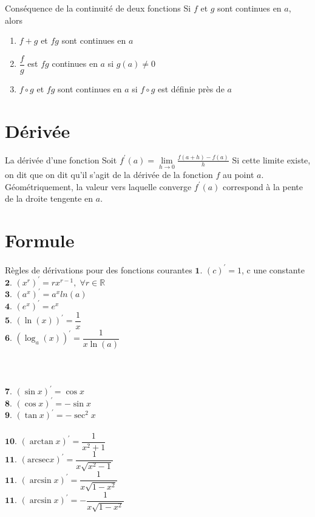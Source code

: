 \documentclass{report}
\newcommand{\varitem}[3][black]{%
    \item[%
        \colorbox{#2}{\textcolor{#1}{\makebox(5.5,7){#3}}}%
    ]
}
\begin{document}
\begin{multicols*}{3}
\begin{Identite}{Conséquence de la continuité de deux fonctions}{}
    Si $f$ et $g$ sont continues en $a$, alors 
    \begin{enumerate}
      \varitem{blue!40}{\textbf{1}} $f+g$ et $fg$ sont continues en $a$ 
      \varitem{blue!40}{\textbf{2}} $\dfrac{f}{g}$ est $fg$ continues en $a$ si $g(a) \neq 0$
      \varitem{blue!40}{\textbf{3}} $f \circ g$ et $fg$ sont continues en $a$ si $f \circ g$ 
      est définie près de $a$
    \end{enumerate}
\end{Identite}


\section{Dérivée}
\begin{Definitionx*}{La dérivée d'une fonction}{}
  Soit $f^{\prime}(a) = \lim\limits_{h\to 0}\frac{f(a + h) - f(a)}{h} $ Si cette limite existe, on dit que 
  on dit qu'il s'agit de \textcolor{myb}{la dérivée de la fonction}   $f$ au point $a$. Géométriquement, 
  la valeur vers laquelle converge $f^{\prime}(a)$ correspond à la pente de la droite tengente en $a$.
\end{Definitionx*}

\section{Formule}
\begin{Concept}{Règles de dérivations pour des fonctions courantes}{}
  $ \textbf{1. }   (c)^{\prime} = 1$, c une constante \;\;
  $ \textbf{2. }   (x^r)^{\prime} = rx^{r -1}, \; \forall r \in \mathbb{R}$ \\
  $ \textbf{3. }   (a^x)^{\prime} = a^xln(a)$ \\ 
  $ \textbf{4. }   (e^x)^{\prime} = e^x$ \\ 
  $ \textbf{5. }   (\ln(x))^{\prime} = \dfrac{1}{x} $ \\
  $ \textbf{6. }   (\log_a(x))^{\prime} = \dfrac{1}{x\ln(a)}$ \\\\\\\\
  $ \textbf{7. }   (\sin x)^{\prime} = \cos x$ \\ 
  $ \textbf{8. }   (\cos x)^{\prime} = - \sin x$ \\
  $ \textbf{9. }   (\tan x)^{\prime} = -\sec^2 x$ \\\\
  $ \textbf{10. }   (\arctan x)^{\prime} = \dfrac{1}{x^2 +1}$ \\
  $ \textbf{11. }   (\text{arcsec}x)^{\prime} = \dfrac{1}{x\sqrt{x^2 -1}}$ \\
  $ \textbf{11. }   (\arcsin x)^{\prime} = \dfrac{1}{x\sqrt{1 - x^2}}$ \\
  $ \textbf{11. }   (\arcsin x)^{\prime} = -\dfrac{1}{x\sqrt{1 - x^2}}$ 
\end{Concept}


\end{multicols*}
\end{document}
